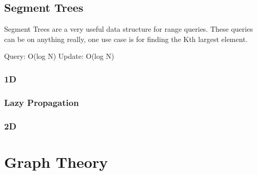 \documentclass{article}
\begin{document}
\subsection{Segment Trees}

\begin{flushleft}
Segment Trees are a very useful data structure for range queries.
These queries can be on anything really, one use case is for finding the Kth largest element.

Query: O(log N)
Update: O(log N)
\end{flushleft}

\subsubsection{1D}

\subsubsection{Lazy Propagation}

\subsubsection{2D}


\section{Graph Theory}
\end{document}
